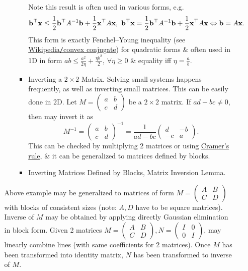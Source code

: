 \documentclass{article}
\begin{document}
\begin{enumerate}
\begin{itemize}
\begin{itemize}
\begin{itemize}
				Note this result is often used in various forms, e.g.
				\begin{equation}
					{\bf b}^\top{\bf x}\le\frac{1}{2}{\bf b}	^\top A^{-1}{\bf b} + \frac{1}{2}{\bf x}^\top A{\bf x},\ {\bf b}^\top{\bf x} = \frac{1}{2}{\bf b}	^\top A^{-1}{\bf b} + \frac{1}{2}{\bf x}^\top A{\bf x}\Leftrightarrow{\bf b} = A{\bf x}.
				\end{equation}
				This form is exactly Fenchel--Young inequality (see \href{https://en.wikipedia.org/wiki/Convex_conjugate}{Wikipedia{\tt/}convex conjugate}) for quadratic forms \& often used in 1D in form $ab\le\frac{a^2}{2\eta} + \frac{\eta b^2}{2}$, $\forall\eta\ge0$ \& equality iff $\eta = \frac{a}{b}$.
				\item {\sf Inverting a $2\times2$ Matrix.} Solving small systems happens frequently, as well as inverting small matrices. This can be easily done in 2D. Let $M = \begin{pmatrix}
					a & b\\c & d
				\end{pmatrix}$ be a $2\times2$ matrix. If $ad - bc\ne0$, then may invert it as
				\begin{equation}
					M^{-1} = \begin{pmatrix}
						a & b\\c & d
					\end{pmatrix}^{-1} = \frac{1}{ad - bc}\begin{pmatrix}
					d & -b\\-c & a
					\end{pmatrix}.
				\end{equation}
				This can be checked by multiplying 2 matrices or using \href{https://en.wikipedia.org/wiki/Cramer's_rule}{Cramer's rule}, \& it can be generalized to matrices defined by blocks.
				\item {\sf Inverting Matrices Defined by Blocks, Matrix Inversion Lemma.}
			\end{itemize}
		\end{itemize}
		Above example may be generalized to matrices of form $M = \begin{pmatrix}
			A & B\\C & D
		\end{pmatrix}$ with blocks of consistent sizes (note: $A,D$ have to be square matrices). Inverse of $M$ may be obtained by applying directly Gaussian elimination in block form. Given 2 matrices $M = \begin{pmatrix}
			A & B\\C & D
		\end{pmatrix},N = \begin{pmatrix}
			I & 0\\0 & I
		\end{pmatrix}$, may linearly combine lines (with same coefficients for 2 matrices). Once $M$ has been transformed into identity matrix, $N$ has been transformed to inverse of $M$.
		

\end{itemize}
\end{enumerate}
\end{document}
